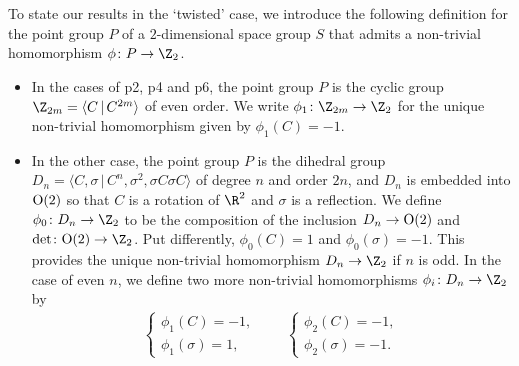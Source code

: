 To state our results in the `twisted' case, we introduce the following def\/inition for the point group $P$ of a $2$-dimensional space group $S$ that admits a non-trivial homomorphism $\phi\colon P \to \Z_2$.
\begin{itemize}\itemsep=0pt
\item
In the cases of \textsf{p2}, \textsf{p4} and \textsf{p6}, the point group $P$ is the cyclic group $\Z_{2m} = \langle C \,|\, C^{2m} \rangle$ of even order. We write $\phi_1\colon \Z_{2m} \to \Z_2$ for the unique non-trivial homomorphism given by $\phi_1(C) = -1$.

\item
In the other case, the point group $P$ is the dihedral group $D_n = \langle C, \sigma \,|\, C^n, \sigma^2, \sigma C \sigma C \rangle$
of degree $n$ and order $2n$, and $D_n$ is embedded into ${\rm O}(2)$ so that $C$ is a rotation of $\R^2$ and $\sigma$ is a ref\/lection. We def\/ine $\phi_0 \colon D_n \to \Z_2$ to be the composition of the inclusion $D_n \to {\rm O}(2)$ and $\det \colon {\rm O}(2) \to \Z_2$. Put dif\/ferently, $\phi_0(C) = 1$ and $\phi_0(\sigma) = -1$. This provides the unique non-trivial homomorphism $D_n \to \Z_2$ if $n$ is odd. In the case of even $n$, we def\/ine two more non-trivial homomorphisms $\phi_i \colon D_n \to \Z_2$ by
\begin{gather*}
\begin{cases}
\phi_1(C) = -1, \\
\phi_1(\sigma) = 1,
\end{cases} \qquad
\begin{cases}
\phi_2(C) = -1, \\
\phi_2(\sigma) = -1.
\end{cases}
\end{gather*}
\end{itemize}
